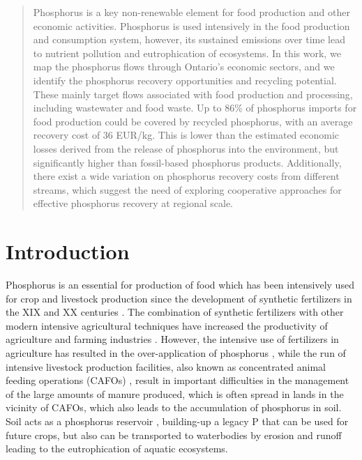 \documentclass[authoryear]{elsarticle}
\begin{document}
\begin{frontmatter}
\begin{abstract}
		Phosphorus is a key non-renewable element for food production and other economic activities. Phosphorus is used intensively in the food production and consumption system, however, its sustained emissions over time lead to nutrient pollution and eutrophication of ecosystems. In this work, we map the phosphorus flows through Ontario’s economic sectors, and we identify the phosphorus recovery opportunities and recycling potential. These mainly target flows associated with food production and processing, including wastewater and food waste. Up to 86\% of phosphorus imports for food production could be covered by recycled phosphorus, with an average recovery cost of 36 EUR/kg. This is lower than the estimated economic losses derived from the release of phosphorus into the environment, but significantly higher than fossil-based phosphorus products. Additionally, there exist a wide variation on phosphorus recovery costs from different streams, which suggest the need of exploring cooperative approaches for effective phosphorus recovery at regional scale.
	\end{abstract}
%	
\end{frontmatter}


\section{Introduction}
Phosphorus is an essential for production of food which has been intensively used for crop and livestock production since the development of synthetic fertilizers in the XIX and XX centuries \citep{Kausar19}. The combination of synthetic fertilizers with other modern intensive agricultural techniques have increased the productivity of agriculture and farming industries \citep{pingali2012green}.
However, the intensive use of fertilizers in agriculture has resulted in the over-application of phosphorus \citep{reid2019phosphorus}, while the run of intensive livestock production facilities, also known as concentrated animal feeding operations (CAFOs) \citep{animal_unit_definition}, result in important difficulties in the management of the large amounts of manure produced, which is often spread in lands in the vicinity of CAFOs, which also leads to the accumulation of phosphorus in soil. Soil acts as a phosphorus reservoir \citep{ehlert2003potential}, building-up a legacy P that can be used for future crops, but also can be transported to waterbodies by erosion and runoff leading to the eutrophication of aquatic ecosystems.
\end{document}
